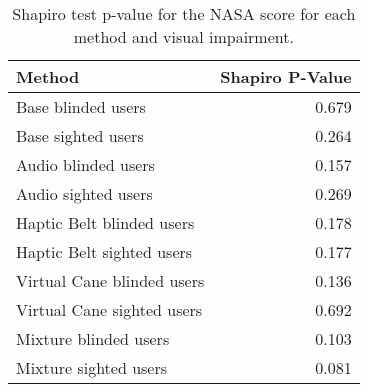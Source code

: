 
\begin{table}[!htb]
\centering
\caption{Shapiro test p-value for the NASA score for each method and visual impairment.}
\label{tab:shapiro_nasa_score}
\begin{tabular}{lr}
\toprule
                    Method &  Shapiro P-Value \\
\midrule
        Base blinded users &            0.679 \\
        Base sighted users &            0.264 \\
       Audio blinded users &            0.157 \\
       Audio sighted users &            0.269 \\
 Haptic Belt blinded users &            0.178 \\
 Haptic Belt sighted users &            0.177 \\
Virtual Cane blinded users &            0.136 \\
Virtual Cane sighted users &            0.692 \\
     Mixture blinded users &            0.103 \\
     Mixture sighted users &            0.081 \\
\bottomrule
\end{tabular}
\end{table}

